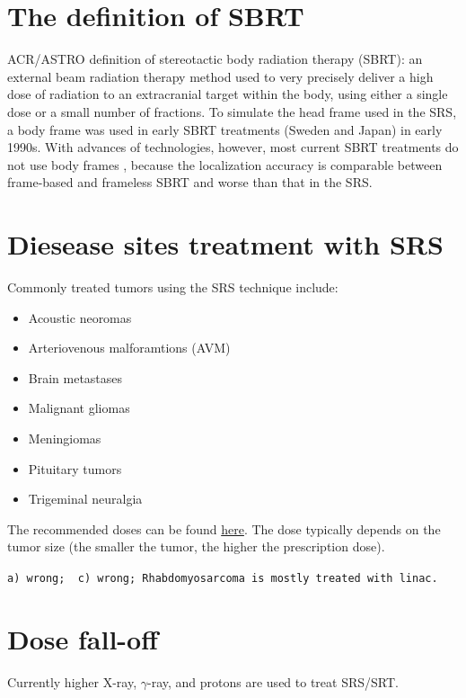 \documentclass[]{book}
\providecommand{\tightlist}{%
  \setlength{\itemsep}{0pt}\setlength{\parskip}{0pt}}
\theoremstyle{definition}
\theoremstyle{definition}
\theoremstyle{definition}
\theoremstyle{remark}
\begin{document}
\section{The definition of SBRT}\label{the-definition-of-sbrt}

ACR/ASTRO definition of stereotactic body radiation therapy (SBRT): an
external beam radiation therapy method used to very precisely deliver a
high dose of radiation to an extracranial target within the body, using
either a single dose or a small number of fractions. To simulate the
head frame used in the SRS, a body frame was used in early SBRT
treatments (Sweden and Japan) in early 1990s. With advances of
technologies, however, most current SBRT treatments do not use body
frames , because the localization accuracy is comparable between
frame-based and frameless SBRT and worse than that in the SRS.

\section{Diesease sites treatment with
SRS}\label{diesease-sites-treatment-with-srs}

Commonly treated tumors using the SRS technique include:

\begin{itemize}
\tightlist
\item
  Acoustic neoromas
\item
  Arteriovenous malforamtions (AVM)
\item
  Brain metastases
\item
  Malignant gliomas
\item
  Meningiomas
\item
  Pituitary tumors
\item
  Trigeminal neuralgia
\end{itemize}

The recommended doses can be found
\href{http://www.aboutcancer.com/gk_doses.htm}{here}. The dose typically
depends on the tumor size (the smaller the tumor, the higher the
prescription dose).

\texttt{a)\ wrong;\ \ c)\ wrong;\ Rhabdomyosarcoma\ is\ mostly\ treated\ with\ linac.}

\section{Dose fall-off}\label{dose-fall-off}

Currently higher X-ray, \(\gamma\)-ray, and protons are used to treat
SRS/SRT.
\end{document}
